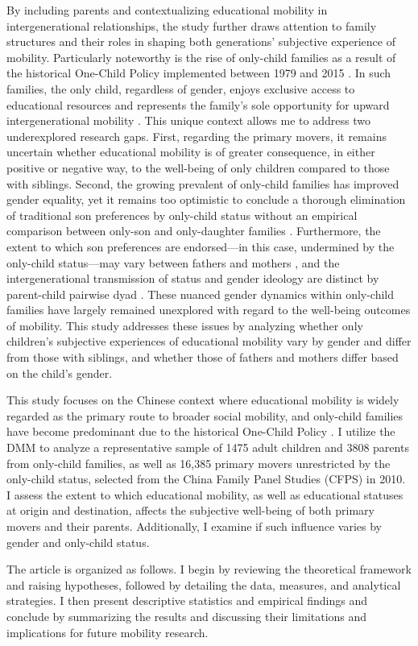 By including parents and contextualizing educational mobility in intergenerational relationships, the study further draws attention to family structures and their roles in shaping both generations' subjective experience of mobility. Particularly noteworthy is the rise of only-child families as a result of the historical One-Child Policy implemented between 1979 and 2015 \parencite{settlesOneChildPolicyIts2013}. In such families, the only child, regardless of gender, enjoys exclusive access to educational resources and represents the family's sole opportunity for upward intergenerational mobility \parencite{falboQuantitativeReviewOnly1986}. This unique context allows me to address two underexplored research gaps. First, regarding the primary movers, it remains uncertain whether educational mobility is of greater consequence, in either positive or negative way, to the well-being of only children compared to those with siblings. Second, the growing prevalent of only-child families has improved gender equality, yet it remains too optimistic to conclude a thorough elimination of traditional son preferences by only-child status without an empirical comparison between only-son and only-daughter families \parencite{fongChinasOneChildPolicy2002,liuBoysOnlychildrenGirls2006,wuFertilityDeclineWomens2014}. Furthermore, the extent to which son preferences are endorsed—in this case, undermined by the only-child status—may vary between fathers and mothers \parencite{sunAreMothersSons2017}, and the intergenerational transmission of status and gender ideology are distinct by parent-child pairwise dyad \parencite{huGenderEducationExpansion2023}. These nuanced gender dynamics within only-child families have largely remained unexplored with regard to the well-being outcomes of mobility. This study addresses these issues by analyzing whether only children's subjective experiences of educational mobility vary by gender and differ from those with siblings, and whether those of fathers and mothers differ based on the child's gender.

This study focuses on the Chinese context where educational mobility is widely regarded as the primary route to broader social mobility, and only-child families have become predominant due to the historical One-Child Policy \parencite{settlesOneChildPolicyIts2013}. I utilize the DMM to analyze a representative sample of 1475 adult children and 3808 parents from only-child families, as well as 16,385 primary movers unrestricted by the only-child status, selected from the China Family Panel Studies (CFPS) in 2010. I assess the extent to which educational mobility, as well as educational statuses at origin and destination, affects the subjective well-being of both primary movers and their parents. Additionally, I examine if such influence varies by gender and only-child status.

The article is organized as follows. I begin by reviewing the theoretical framework and raising hypotheses, followed by detailing the data, measures, and analytical strategies. I then present descriptive statistics and empirical findings and conclude by summarizing the results and discussing their limitations and implications for future mobility research.
